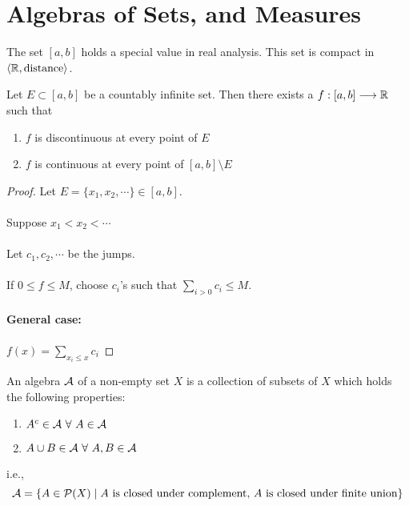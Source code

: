 \documentclass[a4paper]{book}
\begin{document}
\chapter{Algebras of Sets, and Measures}
The set $[a,b]$ holds a special value in real analysis. This set is compact in $\langle \mathbb{R}, \text{distance} \rangle$.
\begin{remark}
Let $E \subset [a,b]$ be a countably infinite set. Then there exists a $f: [a,b] \longrightarrow \mathbb{R}$ such that \begin{enumerate}
\item $f$ is discontinuous at every point of $E$
\item $f$ is continuous at every point of $[a,b] \setminus E$
\end{enumerate}
\end{remark}
\begin{proof}
Let $E = \lbrace x_1, x_2, \cdots \rbrace \in [a,b]$. \\ \\
Suppose $x_1 < x_2 < \cdots $ \\\\
Let $c_1, c_2, \cdots$ be the jumps. \\\\
If $0 \leq f \leq M$, choose $c_i$'s such that $\displaystyle \sum_{i>0} c_i \leq M$. \\\\
{\bf General case: } \\\\
$\displaystyle f(x) = \sum _{x_i \leq x} c_i$
\end{proof}
\newpage
{}
\begin{definition}
An algebra $\mathcal{A}$ of a non-empty set $X$ is a collection of subsets of $X$ which holds the following properties:
\begin{enumerate}
\item $A^c \in \mathcal{A}\ \forall\ A\in \mathcal{A}$
\item $A \cup B \in \mathcal{A}\ \forall\ A,B \in \mathcal{A}$
\end{enumerate}
i.e.,
\[ \mathcal{A} = \qty{A \in \mathcal{P}(X) \mid A \text{ is closed under complement, } A \text{ is closed under finite union}} \]
\end{definition}

\end{document}
